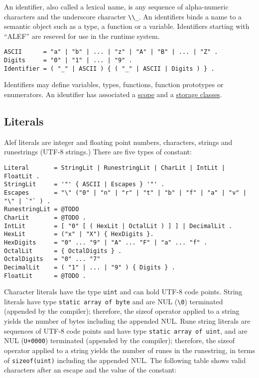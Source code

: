 An identifier, also called a lexical name, is any sequence of
alpha-numeric characters and the underscore character
\passthrough{\lstinline!\\\_!}. An identifiers binds a name to a
semantic object such as a type, a function or a variable. Identifiers
starting with ``ALEF'' are reseved for use in the runtime system.

\begin{lstlisting}
ASCII      = "a" | "b" | ... | "z" | "A" | "B" | ... | "Z" .
Digits     = "0" | "1" | ... | "9" .
Identifier = ( "_" | ASCII ) { ( "_" | ASCII | Digits ) } .
\end{lstlisting}

Identifiers may define variables, types, functions, function prototypes
or enumerators. An identifier has associated a
\protect\hyperlink{scopes}{scope} and a \protect\hyperlink{storage-classes}{storage classes}.

\hypertarget{literals}{%
\subsection{Literals}\label{literals}}

Alef literals are integer and floating point numbers, characters,
strings and runestrings (UTF-8 strings.) There are five types of
constant:

\begin{lstlisting}
Literal       = StringLit | RunestringLit | CharLit | IntLit | FloatLit .
StringLit     = '"' { ASCII | Escapes } '"' .
Escapes       = "\" ("0" | "n" | "r" | "t" | "b" | "f" | "a" | "v" | "\" | `"` ) .
RunestringLit = @TODO
CharLit       = @TODO .
IntLit        = [ "0" [ ( HexLit | OctalLit ) ] ] | DecimalLit .
HexLit        = ("x" | "X") { HexDigits }.
HexDigits     = "0" ... "9" | "A" ... "F" | "a" ... "f" .
OctalLit      = { OctalDigits } .
OctalDigits   = "0" ... "7"
DecimalLit    = ( "1" | ... | "9" ) { Digits } .
FloatLit      = @TODO . 
\end{lstlisting}

Character literals have the type \passthrough{\lstinline!uint!} and can
hold UTF-8 code points. String literals have type
\passthrough{\lstinline!static array of byte!} and are NUL
(\passthrough{\lstinline!\\0!}) terminated (appended by the compiler);
therefore, the sizeof operator applied to a string yields the number of
bytes including the appended NUL. Rune string literals are sequences of
UTF-8 code points and have type
\passthrough{\lstinline!static array of uint!}, and are NUL
(\passthrough{\lstinline!U+0000!}) terminated (appended by the
compiler); therefore, the sizeof operator applied to a string yields the
number of runes in the runestring, in terms of
\passthrough{\lstinline!sizeof(uint)!} including the appended NUL. The
following table shows valid characters after an escape and the value of
the constant:

